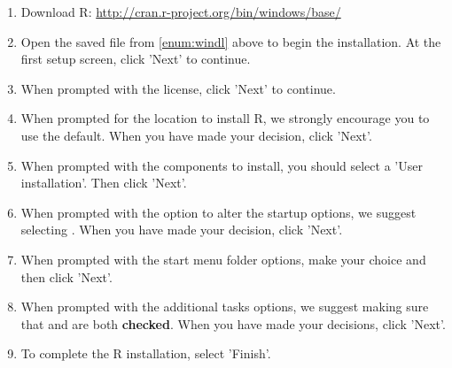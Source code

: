 \begin{enumerate}
  \item Download R: \url{http://cran.r-project.org/bin/windows/base/} \label{enum:windl}
  \item Open the saved file from \ref{enum:windl} above to begin the installation.  At the first setup screen, click 'Next' to continue.
  \item When prompted with the license, click 'Next' to continue.
  \item When prompted for the location to install R, we strongly encourage you to use the default.  When you have made your decision, click 'Next'.
  \item When prompted with the components to install, you should select a 'User installation'.  Then click 'Next'.
  \item When prompted with the option to alter the startup options, we suggest selecting .  When you have made your decision, click 'Next'.
  \item When prompted with the start menu folder options, make your choice and then click 'Next'.
  \item When prompted with the additional tasks options, we suggest making sure that  and  are both \textbf{checked}.  When you have made your decisions, click 'Next'.
  \item To complete the R installation, select 'Finish'.
\end{enumerate}





